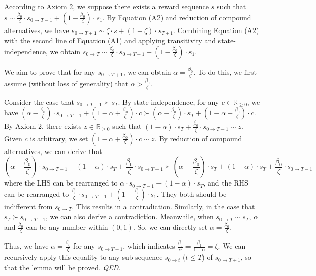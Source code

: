 \documentclass[
  12pt,
]{article}
\begin{document}
According to Axiom 2, we suppose there exists a reward sequence \(s\)
such that
\(s \sim \frac{\beta_0}{\zeta}\cdot s_{0 \rightarrow T-1} + (1-\frac{\beta_0}{\zeta})\cdot s_1\).
By Equation (A2) and reduction of compound alternatives, we have
\(s_{0\rightarrow T+1}\sim \zeta \cdot s + (1-\zeta)\cdot s_{T+1}\).
Combining Equation (A2) with the second line of Equation (A1) and
applying transitivity and state-independence, we obtain
\(s_{0\rightarrow T} \sim \frac{\beta_0}{\zeta}\cdot s_{0 \rightarrow T-1} + (1-\frac{\beta_0}{\zeta})\cdot s_1\).

We aim to prove that for any \(s_{0\rightarrow T+1}\), we can obtain
\(\alpha=\frac{\beta_0}{\zeta}\). To do this, we first assume (without
loss of generality) that \(\alpha > \frac{\beta_0}{\zeta}\).

Consider the case that \(s_{0 \rightarrow T-1} \succ s_T\). By
state-independence, for any \(c\in \mathbb{R}_{\geq 0}\), we have
\((\alpha - \frac{\beta_0}{\zeta})\cdot s_{0\rightarrow T-1} + (1-\alpha+\frac{\beta_0}{\zeta})\cdot c \succ (\alpha - \frac{\beta_0}{\zeta})\cdot s_T + (1-\alpha+\frac{\beta_0}{\zeta})\cdot c\).
By Axiom 2, there exists \(z\in \mathbb{R}_{\geq 0}\) such that
\((1-\alpha)\cdot s_T + \frac{\beta_0}{\zeta}\cdot s_{0\rightarrow T-1}\sim z\).
Given \(c\) is arbitrary, we set
\((1-\alpha+\frac{\beta_0}{\zeta})\cdot c \sim z\). By reduction of
compound alternatives, we can derive that\[
(\alpha-\frac{\beta_0}{\zeta})\cdot s_{0\rightarrow T-1} +(1-\alpha)\cdot s_T + \frac{\beta_0}{\zeta}\cdot s_{0\rightarrow T-1} \succ (\alpha-\frac{\beta_0}{\zeta})\cdot s_T +(1-\alpha)\cdot s_T + \frac{\beta_0}{\zeta}\cdot s_{0\rightarrow T-1}
\]where the LHS can be rearranged to
\(\alpha\cdot s_{0\rightarrow T-1} + (1-\alpha)\cdot s_T\), and the RHS
can be rearranged to
\(\frac{\beta_0}{\zeta}\cdot s_{0 \rightarrow T-1} + (1-\frac{\beta_0}{\zeta})\cdot s_1\).
They both should be indifferent from \(s_{0\rightarrow T}\). This
results in a contradiction. Similarly, in the case that
\(s_T \succ s_{0 \rightarrow T-1}\), we can also derive a contradiction.
Meanwhile, when \(s_{0\rightarrow T}\sim s_T\), \(\alpha\) and
\(\frac{\beta_0}{\zeta}\) can be any number within \((0,1)\). So, we can
directly set \(\alpha = \frac{\beta_0}{\zeta}\).

Thus, we have \(\alpha = \frac{\beta_0}{\zeta}\) for any
\(s_{0\rightarrow T+1}\), which indicates
\(\frac{\beta_0}{\alpha}=\frac{\beta_1}{1-\alpha}=\zeta\). We can
recursively apply this equality to any sub-sequence
\(s_{0\rightarrow t}\) (\(t\leq T\)) of \(s_{0\rightarrow T+1}\), so
that the lemma will be proved. \emph{QED}.
\end{document}
